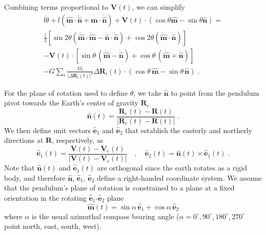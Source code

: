 \documentclass[12pt]{article}
\providecommand{\vecsymbol}[1]{\ensuremath{\boldsymbol{#1}}}
\providecommand{\Rv}{\vecsymbol{R}}
\providecommand{\Vv}{\vecsymbol{V}}
\providecommand{\mv}{\hat{\vecsymbol{m}}}
\providecommand{\nv}{\hat{\vecsymbol{n}}}
\providecommand{\ev}{\hat{\vecsymbol{e}}}
\providecommand{\thddot}{\ddot{\theta}}
\begin{document}
Combining terms proportional to $\Vv(t)$, we can simplify
\begin{multline}
l\thddot + l(\mv\cdot\ddot{\nv} + \dot{\mv}\cdot\dot{\nv}) +
\dot{\Vv}(t)\cdot\left(\cos\theta \mv - \sin\theta \nv\right) =\\
\frac{l}{2} \left[ \sin 2\theta \left( \dot{\mv}\cdot\dot{\mv} - \dot{\nv}\cdot\dot{\nv}\right) +
\cos 2\theta \left(\dot{\mv}\cdot\dot{\nv}\right) \right]\\
-\Vv(t)\cdot\left[ \sin\theta\,(\dot{\mv}-\dot{\nv}) +
\cos\theta\,(\dot{\mv}+\dot{\nv})\right]\\
-G \sum_i \frac{M_i}{\left|\Delta\Rv_i(t)\right|^3} \Delta\Rv_i(t)\cdot(\cos\theta\, \mv - \sin\theta\, \nv) \; .
\end{multline}

For the plane of rotation used to define $\theta$, we take $\nv$ to point from the pendulum pivot towards the Earth's center of gravity $\Rv_e$
\begin{equation}
\nv(t) = \frac{\Rv_e(t) - \Rv(t)}{\left|\Rv_e(t) - \Rv(t)\right|} \; .
\end{equation}
We then define unit vectors $\ev_1$ and $\ev_2$ that establish the easterly and northerly directions at $\Rv$, respectively, as
\begin{equation}
\ev_1(t) = \frac{\Vv(t) - \Vv_e(t)}{\left|\Vv(t) - \Vv_e(t)\right|} \quad , \quad
\ev_2(t) = \nv(t) \times \ev_1(t) \; .
\end{equation}
Note that $\nv(t)$ and $\ev_1(t)$ are orthogonal since the earth rotates as a rigid body, and therefore $\nv$, $\ev_1$, $\ev_2$ define a right-handed coordinate system. We assume that the pendulum's plane of rotation is constrained to a plane at a fixed orientation in the rotating $\ev_1$-$\ev_2$ plane
\begin{equation}
\mv(t) = \sin\alpha\,\ev_1 + \cos\alpha\,\ev_2
\end{equation}
where $\alpha$ is the usual azimuthal compass bearing angle ($\alpha = 0^\circ, 90^\circ, 180^\circ, 270^\circ$ point north, east, south, west).
\end{document}
